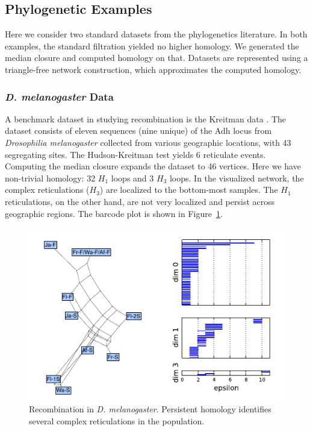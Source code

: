 \subsection{Phylogenetic Examples}

Here we consider two standard datasets from the phylogenetics literature.
In both examples, the standard filtration yielded no higher homology.
We generated the median closure and computed homology on that.
Datasets are represented using a triangle-free network construction, which approximates the computed homology.

\subsubsection{{\textit{D. melanogaster}} Data}

A benchmark dataset in studying recombination is the Kreitman data \cite{Kreitman:1983}.
The dataset consists of eleven sequences (nine unique) of the Adh locus from \emph{Drosophilia melanogaster} collected from various geographic locations, with 43 segregating sites.
The Hudson-Kreitman test yields 6 reticulate events.
Computing the median closure expands the dataset to 46 vertices.
Here we have non-trivial homology: 32 $H_1$ loops and 3 $H_3$ loops.
In the visualized network, the complex reticulations ($H_3$) are localized to the bottom-most samples.
The $H_1$ reticulations, on the other hand, are not very localized and persist across geographic regions.
The barcode plot is shown in Figure~\ref{fig:kreitman}.

\begin{figure}
\centering
\includegraphics[width=\columnwidth]{fig/complex_construction/kreitman.pdf}
\caption[Recombination in \emph{D. melanogaster}]{Recombination in \emph{D. melanogaster}. Persistent homology identifies several complex reticulations in the population.}
\label{fig:kreitman}
\end{figure}

